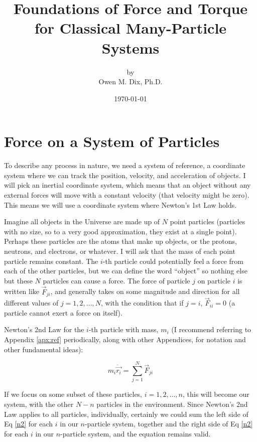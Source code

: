 \documentclass[10pt]{article}
\title{Foundations of Force and Torque for Classical Many-Particle Systems}
\author{by\\Owen M. Dix, Ph.D.}
\date{\today}
\begin{document}
\maketitle

\tableofcontents

\section{Force on a System of Particles}

To describe any process in nature, we need a system of reference, a
coordinate system where we can track the position, velocity, and 
acceleration of objects. I will pick an inertial coordinate system, which 
means that an object without any external forces will move with a constant 
velocity (that velocity might be zero). This means we will use a coordinate 
system where Newton's 1st Law holds.

Imagine all objects in the Universe are made up of 
$N$ point particles (particles with no size, so to a very good approximation, 
they exist at a single point). Perhaps these particles are the atoms that 
make up objects, or the protons, neutrons, and electrons, or whatever. I 
will ask that the mass of each point particle remains constant. 
The $i$-th particle could potentially
feel a force from each of the other particles, but we can define 
the word ``object'' so nothing else but these $N$ particles 
can cause a force. The force of particle $j$ on particle $i$ 
is written like $\vec{F}_{ji}$, and generally takes 
on some magnitude and direction for all different values of $j=1,2,\ldots,N$, 
with the condition that if $j=i$, $\vec{F}_{ii}=0$ (a particle cannot 
exert a force on itself).

Newton's 2nd Law for the $i$-th particle with mass, $m_i$ (I recommend 
referring to Appendix \ref{apx:ref} periodically, along with 
other Appendices, for notation and other fundamental ideas):

\begin{equation} \label{n2}
    m_i\ddot{\vec{r_i}} = \sum_{j=1}^{N}\vec{F}_{ji}
\end{equation}

If we focus on some subset of these particles, $i=1,2,\ldots,n$, this will 
become our system, with the other $N-n$ particles in the environment.
Since Newton's 2nd Law applies to all particles, individually, 
certainly we could sum the left side of Eq \ref{n2} for each $i$ in our 
$n$-particle system, together and the right 
side of Eq \ref{n2} for each $i$ in our $n$-particle system, and 
the equation remains valid.
\end{document}
